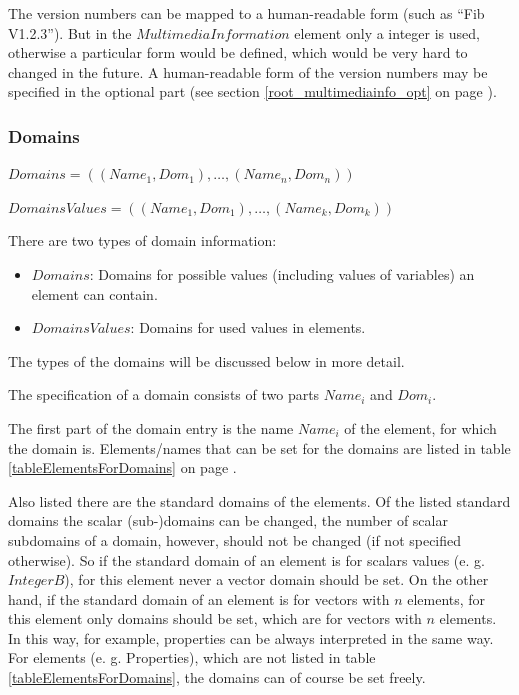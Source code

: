 The version numbers can be mapped to a human-readable form (such as ``Fib V1.2.3''). But in the $MultimediaInformation$ element only a integer is used, otherwise a particular form would be defined, which would be very hard to changed in the future. A human-readable form of the version numbers may be specified in the optional part (see section \ref {root_multimediainfo_opt} on page \pageref{root_multimediainfo_opt}).


\subsubsection{Domains}
\label{root_definition_ranges}

$Domains=( (Name_1, Dom_1), \ldots , (Name_n, Dom_n) )$

\bigskip\noindent
$DomainsValues=( (Name_1, Dom_1), \ldots , (Name_k, Dom_k) )$

\bigskip\noindent
There are two types of domain information:
\begin{itemize}
 \item $Domains$: Domains for possible values (including values of variables) an element can contain.
 \item $DomainsValues$: Domains for used values in elements.
\end{itemize}
The types of the domains will be discussed below in more detail.

\bigskip\noindent
The specification of a domain consists of two parts $Name_i$ and $Dom_i$.

The first part of the domain entry is the name $Name_i$ of the element, for which the domain is. Elements/names that can be set for the domains are listed in table \ref{tableElementsForDomains} on page \pageref{tableElementsForDomainsBegin}.

Also listed there are the standard domains of the elements.
Of the listed standard domains the scalar (sub-)domains can be changed, the number of scalar subdomains of a domain, however, should not be changed (if not specified otherwise). So if the standard domain of an element is for scalars values (e. g. $IntegerB$), for this element never a vector domain should be set. On the other hand, if the standard domain of an element is for vectors with $n$ elements, for this element only domains should be set, which are for vectors with $n$ elements. In this way, for example, properties can be always interpreted in the same way.
For elements (e. g. Properties), which are not listed in table \ref{tableElementsForDomains}, the domains can of course be set freely.

